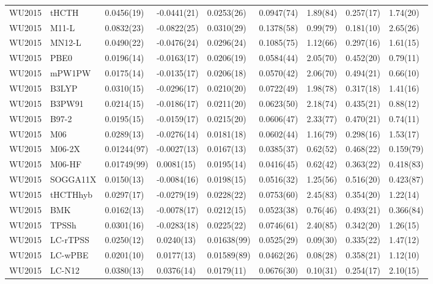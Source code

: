 \begin{table}[ht]
\begin{tabular}{lllllllll}
  WU2015 & tHCTH & 0.0456(19) & -0.0441(21) & 0.0253(26) & 0.0947(74) & 1.89(84) & 0.257(17) & 1.74(20) \\ 
  WU2015 & M11-L & 0.0832(23) & -0.0822(25) & 0.0310(29) & 0.1378(58) & 0.99(79) & 0.181(10) & 2.65(26) \\ 
  WU2015 & MN12-L & 0.0490(22) & -0.0476(24) & 0.0296(24) & 0.1085(75) & 1.12(66) & 0.297(16) & 1.61(15) \\ 
  WU2015 & PBE0 & 0.0196(14) & -0.0163(17) & 0.0206(19) & 0.0584(44) & 2.05(70) & 0.452(20) & 0.79(11) \\ 
  WU2015 & mPW1PW & 0.0175(14) & -0.0135(17) & 0.0206(18) & 0.0570(42) & 2.06(70) & 0.494(21) & 0.66(10) \\ 
  WU2015 & B3LYP & 0.0310(15) & -0.0296(17) & 0.0210(20) & 0.0722(49) & 1.98(78) & 0.317(18) & 1.41(16) \\ 
  WU2015 & B3PW91 & 0.0214(15) & -0.0186(17) & 0.0211(20) & 0.0623(50) & 2.18(74) & 0.435(21) & 0.88(12) \\ 
  WU2015 & B97-2 & 0.0195(15) & -0.0159(17) & 0.0215(20) & 0.0606(47) & 2.33(77) & 0.470(21) & 0.74(11) \\ 
  WU2015 & M06 & 0.0289(13) & -0.0276(14) & 0.0181(18) & 0.0602(44) & 1.16(79) & 0.298(16) & 1.53(17) \\ 
  WU2015 & M06-2X & 0.01244(97) & -0.0027(13) & 0.0167(13) & 0.0385(37) & 0.62(52) & 0.468(22) & 0.159(79) \\ 
  WU2015 & M06-HF & 0.01749(99) & 0.0081(15) & 0.0195(14) & 0.0416(45) & 0.62(42) & 0.363(22) & 0.418(83) \\ 
  WU2015 & SOGGA11X & 0.0150(13) & -0.0084(16) & 0.0198(15) & 0.0516(32) & 1.25(56) & 0.516(20) & 0.423(87) \\ 
  WU2015 & tHCTHhyb & 0.0297(17) & -0.0279(19) & 0.0228(22) & 0.0753(60) & 2.45(83) & 0.354(20) & 1.22(14) \\ 
  WU2015 & BMK & 0.0162(13) & -0.0078(17) & 0.0212(15) & 0.0523(38) & 0.76(46) & 0.493(21) & 0.366(84) \\ 
  WU2015 & TPSSh & 0.0301(16) & -0.0283(18) & 0.0225(22) & 0.0746(61) & 2.40(85) & 0.342(20) & 1.26(15) \\ 
  WU2015 & LC-rTPSS & 0.0250(12) & 0.0240(13) & 0.01638(99) & 0.0525(29) & 0.09(30) & 0.335(22) & 1.47(12) \\ 
  WU2015 & LC-wPBE & 0.0201(10) & 0.0177(13) & 0.01589(89) & 0.0462(26) & 0.08(28) & 0.358(21) & 1.12(10) \\ 
  WU2015 & LC-N12 & 0.0380(13) & 0.0376(14) & 0.0179(11) & 0.0676(30) & 0.10(31) & 0.254(17) & 2.10(15) \\ 

\end{tabular}
\end{table}
